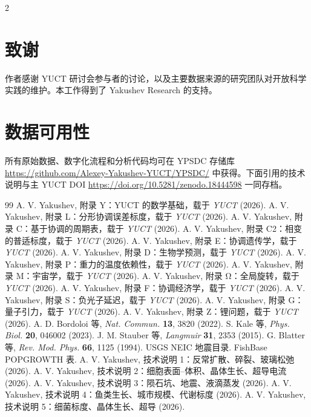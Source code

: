 \documentclass[11pt,a4paper]{article}
\begin{document}
\begin{multicols}{2}
		\section*{致谢}
		
		作者感谢 YUCT 研讨会参与者的讨论，以及主要数据来源的研究团队对开放科学实践的维护。本工作得到了 Yakushev Research 的支持。
		
		\section*{数据可用性}
		
		所有原始数据、数字化流程和分析代码均可在 YPSDC 存储库 \url{https://github.com/Alexey-Yakushev-YUCT/YPSDC/} 中获得。下面引用的技术说明与主 YUCT DOI \url{https://doi.org/10.5281/zenodo.18444598} 一同存档。
		
		\begin{thebibliography}{99}
			 A. V. Yakushev, 附录 Y：YUCT 的数学基础，载于 \emph{YUCT} (2026).
			 A. V. Yakushev, 附录 L：分形协调误差标度，载于 \emph{YUCT} (2026).
			 A. V. Yakushev, 附录 C：基于协调的周期表，载于 \emph{YUCT} (2026).
			 A. V. Yakushev, 附录 C2：相变的普适标度，载于 \emph{YUCT} (2026).
			 A. V. Yakushev, 附录 E：协调遗传学，载于 \emph{YUCT} (2026).
			 A. V. Yakushev, 附录 D：生物学预测，载于 \emph{YUCT} (2026).
			 A. V. Yakushev, 附录 P：重力的温度依赖性，载于 \emph{YUCT} (2026).
			 A. V. Yakushev, 附录 M：宇宙学，载于 \emph{YUCT} (2026).
			 A. V. Yakushev, 附录 Ω：全局旋转，载于 \emph{YUCT} (2026).
			 A. V. Yakushev, 附录 F：协调经济学，载于 \emph{YUCT} (2026).
			 A. V. Yakushev, 附录 S：负光子延迟，载于 \emph{YUCT} (2026).
			 A. V. Yakushev, 附录 G：量子引力，载于 \emph{YUCT} (2026).
			 A. V. Yakushev, 附录 Z：锂问题，载于 \emph{YUCT} (2026).
			 A. D. Bordoloi 等, \emph{Nat. Commun.} \textbf{13}, 3820 (2022).
			 S. Kale 等, \emph{Phys. Biol.} \textbf{20}, 046002 (2023).
			 J. M. Stauber 等, \emph{Langmuir} \textbf{31}, 2353 (2015).
			 G. Blatter 等, \emph{Rev. Mod. Phys.} \textbf{66}, 1125 (1994).
			 USGS NEIC 地震目录.
			 FishBase POPGROWTH 表.
			 A. V. Yakushev, 技术说明 1：反常扩散、碎裂、玻璃松弛 (2026).
			 A. V. Yakushev, 技术说明 2：细胞表面–体积、晶体生长、超导电流 (2026).
			 A. V. Yakushev, 技术说明 3：陨石坑、地震、液滴蒸发 (2026).
			 A. V. Yakushev, 技术说明 4：鱼类生长、城市规模、代谢标度 (2026).
			 A. V. Yakushev, 技术说明 5：细菌标度、晶体生长、超导 (2026).
		\end{thebibliography}
		
	\end{multicols}
\end{document}

